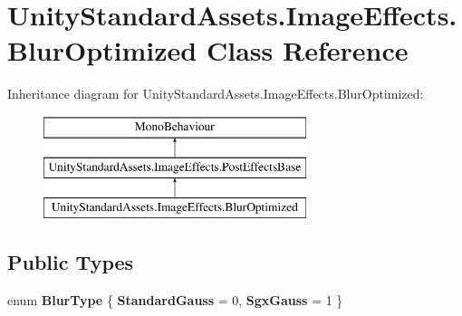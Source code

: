 \hypertarget{class_unity_standard_assets_1_1_image_effects_1_1_blur_optimized}{}\section{Unity\+Standard\+Assets.\+Image\+Effects.\+Blur\+Optimized Class Reference}
\label{class_unity_standard_assets_1_1_image_effects_1_1_blur_optimized}
Inheritance diagram for Unity\+Standard\+Assets.\+Image\+Effects.\+Blur\+Optimized\+:\begin{figure}[H]
\begin{center}
\leavevmode
\includegraphics[height=3.000000cm]{class_unity_standard_assets_1_1_image_effects_1_1_blur_optimized}
\end{center}
\end{figure}
\subsection*{Public Types}
\begin{DoxyCompactItemize}
\item 
enum {\bfseries Blur\+Type} \{ {\bfseries Standard\+Gauss} = 0, 
{\bfseries Sgx\+Gauss} = 1
 \}\hypertarget{class_unity_standard_assets_1_1_image_effects_1_1_blur_optimized_a5e014aebbf344dbbec6748cd537b0790}{}\label{class_unity_standard_assets_1_1_image_effects_1_1_blur_optimized_a5e014aebbf344dbbec6748cd537b0790}

\end{DoxyCompactItemize}
